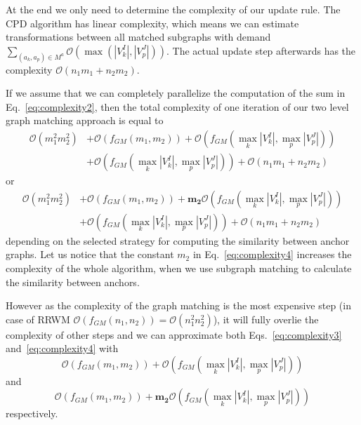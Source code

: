 At the end we only need to determine the complexity of our update rule. The CPD algorithm has linear complexity, which means we can estimate transformations between all matched subgraphs with demand $\sum_{(a_k,a_p)\in M^a}\mathcal{O}(\max(|V^I_k|,|V^J_p|))$. The actual update step afterwards has the complexity $\mathcal{O}(n_1m_1+n_2m_2)$.

If we assume that we can completely parallelize the computation of the sum in Eq.~\eqref{eq:complexity2}, then the total complexity of one iteration of our two level graph matching approach is equal to
\begin{equation}\label{eq:complexity3}
\begin{split}
\mathcal{O}(m_1^2m_2^2)&+\mathcal{O}(f_{GM}(m_1,m_2))+\mathcal{O}(f_{GM}(\max_{k}|V^I_k|,\max_{p}|V^J_p|))\\
                       &+\mathcal{O}(f_{GM}(\max_{k}|V^I_k|,\max_{p}|V^J_p|))+\mathcal{O}(n_1m_1+n_2m_2)
\end{split}
\end{equation}
or
\begin{equation}\label{eq:complexity4}
\begin{split}
\mathcal{O}(m_1^2m_2^2)&+\mathcal{O}(f_{GM}(m_1,m_2))+\mathbf{m_2}\mathcal{O}(f_{GM}(\max_{k}|V^I_k|,\max_{p}|V^J_p|))\\
&+\mathcal{O}(f_{GM}(\max_{k}|V^I_k|,\max_{p}|V^J_p|))+\mathcal{O}(n_1m_1+n_2m_2)
\end{split}
\end{equation}
depending on the selected strategy for computing the similarity between anchor graphs. Let us notice that the constant $m_2$ in Eq.~\eqref{eq:complexity4} increases the complexity of the whole algorithm, when we use subgraph matching to calculate the similarity between anchors.

However as the complexity of the graph matching is the most expensive step (in case of RRWM $\mathcal{O}(f_{GM}(n_1,n_2))=\mathcal{O}(n_1^2n_2^2)$), it will fully overlie the complexity of other steps and we can approximate both Eqs.~\eqref{eq:complexity3} and~\eqref{eq:complexity4} with
\begin{equation}\label{eq:complexity3.1}
\mathcal{O}(f_{GM}(m_1,m_2))+\mathcal{O}(f_{GM}(\max_{k}|V^I_k|,\max_{p}|V^J_p|))
\end{equation} 
and 
\begin{equation}\label{eq:complexity4.1}
\mathcal{O}(f_{GM}(m_1,m_2))+\mathbf{m_2}\mathcal{O}(f_{GM}(\max_{k}|V^I_k|,\max_{p}|V^J_p|))
\end{equation}
respectively.

